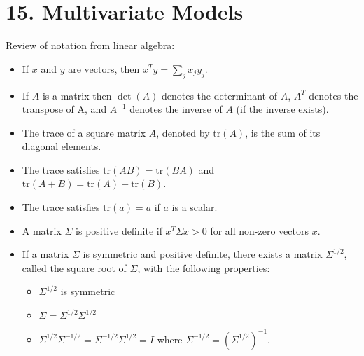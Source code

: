\section*{15. Multivariate Models}\label{multivariate-models}
Review of notation from linear algebra:
\begin{itemize}[tightlist]
\item
  If \(x\) and \(y\) are vectors, then \(x^T y = \sum_{j} x_{j} y_{j}\).
\item
  If \(A\) is a matrix then \(\det(A)\) denotes the determinant of
  \(A\), \(A^T\) denotes the transpose of A, and \(A^{-1}\) denotes the
  inverse of \(A\) (if the inverse exists).
\item
  The trace of a square matrix \(A\), denoted by \(\text{tr}(A)\), is
  the sum of its diagonal elements.
\item
  The trace satisfies \(\text{tr}(AB) = \text{tr}(BA)\) and
  \(\text{tr}(A + B) = \text{tr}(A) + \text{tr}(B)\).
\item
  The trace satisfies \(\text{tr}(a) = a\) if \(a\) is a scalar.
\item
  A matrix \(\Sigma\) is positive definite if \(x^T \Sigma x > 0\) for
  all non-zero vectors \(x\).
\item
  If a matrix \(\Sigma\) is symmetric and positive definite, there
  exists a matrix \(\Sigma^{1/2}\), called the square root of
  \(\Sigma\), with the following properties:
  \begin{itemize}[tightlist]
  \item
\(\Sigma^{1/2}\) is symmetric
  \item
\(\Sigma = \Sigma^{1/2} \Sigma^{1/2}\)
  \item
\(\Sigma^{1/2} \Sigma^{-1/2} = \Sigma^{-1/2} \Sigma^{1/2} = I\)
    where \(\Sigma^{-1/2} = (\Sigma^{1/2})^{-1}\).
  \end{itemize}
\end{itemize}


